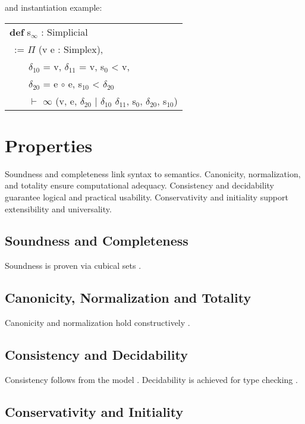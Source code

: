\documentclass[a4paper,UKenglish,cleveref, autoref, thm-restate]{lipics-v2021}
\newcommand{\tabstyle}[0]{\scriptsize\ttfamily\fontseries{l}\selectfont}
\begin{document}
and instantiation example:

\begin{table}[ht]
\tabstyle
\begin{tabular}{l}

\textbf{def} s$_\infty$ : Simplicial \\
\ := $\Pi$ (v e : Simplex), \\
\ \ \ \ $\delta_{10}$ = v, $\delta_{11}$ = v, s$_0$ < v, \\
\ \ \ \ $\delta_{20}$ = e $\circ$ e, s$_{10}$ < $\delta_{20}$ \\
\ \ \ \ $\vdash$ $\infty$ (v, e, $\delta_{20}$ | $\delta_{10}$ $\delta_{11}$, s$_0$, $\delta_{20}$, s$_{10}$)
\end{tabular}
\end{table}

\newpage
\section{Properties}

Soundness and completeness link syntax to semantics.
Canonicity, normalization, and totality ensure computational adequacy.
Consistency and decidability guarantee logical and practical usability.
Conservativity and initiality support extensibility and universality.

\subsection{Soundness and Completeness}

Soundness is proven via cubical sets \cite{CCHM, Awodey12, Coquand18}.

\subsection{Canonicity, Normalization and Totality}

Canonicity and normalization hold constructively \cite{Huber17, Streicher91}.

\subsection{Consistency and Decidability}

Consistency follows from the model \cite{Bezem14}.
Decidability is achieved for type checking \cite{Coquand18}.

\subsection{Conservativity and Initiality}
\end{document}
